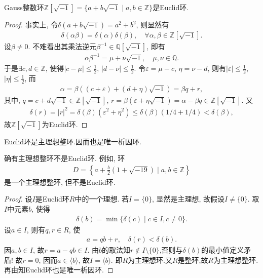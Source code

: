 \documentclass[../../main.tex]{subfiles}%
\begin{document}
\begin{example}
Gauss整数环$\mathbb{Z}[\sqrt{-1}]=\{a+b\sqrt{-1}\mid a,b\in\mathbb{Z}\}$是Euclid环.
\end{example}
\begin{proof}

事实上, 令$\delta(a+b\sqrt{-1})=a^2+b^2$, 则显然有
\begin{align*}
\delta(\alpha\beta)=\delta(\alpha)\delta(\beta),\quad \forall\alpha,\beta\in\mathbb{Z}[\sqrt{-1}].
\end{align*}
设$\beta\neq 0$. 不难看出其乘法逆元$\beta^{-1}\in\mathbb{Q}[\sqrt{-1}]$, 即有
\begin{align*}
\alpha\beta^{-1}=\mu+\nu\sqrt{-1},\quad \mu,\nu\in\mathbb{Q}.
\end{align*}
于是$\exists c,d\in\mathbb{Z}$, 使得$|c-\mu|\leqslant \frac{1}{2}$, $|d-\nu|\leqslant \frac{1}{2}$. 令$\varepsilon=\mu-c$, $\eta=\nu-d$, 则有$|\varepsilon|\leqslant \frac{1}{2}$, $|\eta|\leqslant \frac{1}{2}$, 而
\begin{align*}
\alpha=\beta((c+\varepsilon)+(d+\eta)\sqrt{-1})=\beta q+r,
\end{align*}
其中, $q=c+d\sqrt{-1}\in\mathbb{Z}[\sqrt{-1}]$, $r=\beta(\varepsilon+\eta\sqrt{-1})=\alpha-\beta q\in\mathbb{Z}[\sqrt{-1}]$. 又
\begin{align*}
\delta(r)=|r|^2=\delta(\beta)(\varepsilon^2+\eta^2)\leqslant\delta(\beta)(1/4+1/4)<\delta(\beta),
\end{align*}
故$\mathbb{Z}[\sqrt{-1}]$为Euclid环.

\end{proof}

\begin{theorem}\label{theorem:Euclid环必是主理想整环}
Euclid环是主理想整环.因而也是唯一析因环.
\end{theorem}
\begin{remark}
确有主理想整环不是Euclid环. 例如, 环
\begin{align*}
D=\left\{a+\frac{b}{2}(1+\sqrt{-19})\mid a,b\in\mathbb{Z}\right\}
\end{align*}
是一个主理想整环, 但不是Euclid环.
\end{remark}
\begin{proof}

设$I$是Euclid环$R$中的一个理想. 若$I=\{0\}$, 显然是主理想, 故假设$I\neq\{0\}$. 取$I$中元素$b$, 使得
\begin{align}
\delta(b)=\min\{\delta(c)\mid c\in I,c\neq 0\}.\label{eq:::09gj3ety4s34wygew3tygwef23g2.5.4}
\end{align}
设$a\in I$, 则有$q,r\in R$, 使
\begin{align*}
a=qb+r,\quad \delta(r)<\delta(b).
\end{align*}
因$a,b\in I$, 故$r=a-qb\in I$. 由$b$的取法知$r\notin I\setminus\{0\}$,否则与$\delta(b)$的最小值定义矛盾! 故$r=0$, 因而$a\in\langle b\rangle$, 故$I=\langle b\rangle$. 即$R$为主理想环.又$R$是整环,故$R$为主理想整环.再由知Euclid环也是唯一析因环.

\end{proof}
\end{document}
